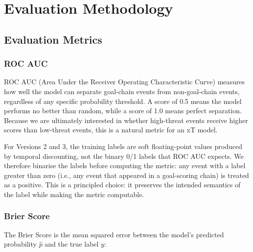 \documentclass{article}
\begin{document}
\section{Evaluation Methodology}\label{sec:eval}

\subsection{Evaluation Metrics}

\subsubsection{ROC AUC}

ROC AUC (Area Under the Receiver Operating Characteristic Curve) measures how well the model can separate goal-chain events from non-goal-chain events, regardless of any specific probability threshold. A score of 0.5 means the model performs no better than random, while a score of 1.0 means perfect separation. Because we are ultimately interested in whether high-threat events receive higher scores than low-threat events, this is a natural metric for an xT model.

For Versions 2 and 3, the training labels are soft floating-point values produced by temporal discounting, not the binary 0/1 labels that ROC AUC expects. We therefore binarise the labels before computing the metric: any event with a label greater than zero (i.e., any event that appeared in a goal-scoring chain) is treated as a positive. This is a principled choice: it preserves the intended semantics of the label while making the metric computable.

\subsubsection{Brier Score}

The Brier Score is the mean squared error between the model's predicted probability $\hat{p}$ and the true label $y$:
\end{document}
